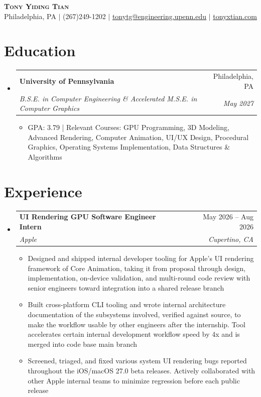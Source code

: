 \documentclass[letterpaper,11pt]{article}
\makeatletter
\newcommand{\resumeItem}[1]{
  \item\small{
    {#1 \vspace{-3pt}}
  }
}
\newcommand{\resumeSubheading}[4]{
  \vspace{-2pt}\item
    \begin{tabular*}{0.97\textwidth}[t]{l@{\extracolsep{\fill}}r}
      \textbf{#1} & #2 \\
      \textit{\small#3} & \textit{\small #4} \\
    \end{tabular*}\vspace{-7pt}
}
\newcommand{\resumeSubHeadingListStart}{\begin{itemize}[leftmargin=0.15in, label={}]}
\newcommand{\resumeSubHeadingListEnd}{\end{itemize}}
\newcommand{\resumeItemListStart}{\begin{itemize}}
\newcommand{\resumeItemListEnd}{\end{itemize}\vspace{-5pt}}
\makeatother
\begin{document}
\begin{center}
    \textbf{\Huge \scshape Tony Yiding Tian} \\ \vspace{1pt}
    \small Philadelphia, PA $|$ (267)249-1202 $|$ \href{mailto:tonytg@engineering.upenn.edu}{\underline{tonytg@engineering.upenn.edu}} $|$
    \href{https://tonyxtian.com}{\underline{tonyxtian.com}}
\end{center}

\section{Education}
  \resumeSubHeadingListStart
    \resumeSubheading
      {University of Pennsylvania}{Philadelphia, PA}
      {B.S.E. in Computer Engineering \& Accelerated M.S.E. in Computer Graphics}{May 2027}
      \resumeItemListStart
        \resumeItem{GPA: 3.79 | Relevant Courses: GPU Programming, 3D Modeling, Advanced Rendering, Computer Animation, UI/UX Design, Procedural Graphics, Operating Systems Implementation, Data Structures \& Algorithms}
      \resumeItemListEnd
  \resumeSubHeadingListEnd

  \section{Experience}
  \resumeSubHeadingListStart
    \resumeSubheading
      {UI Rendering GPU Software Engineer Intern}{May 2026 -- Aug 2026}
      {Apple}{Cupertino, CA}
      \resumeItemListStart
        \resumeItem{Designed and shipped internal developer tooling for Apple's UI rendering framework of Core Animation, taking it from proposal through design, implementation, on-device validation, and multi-round code review with senior engineers toward integration into a shared release branch}
        \resumeItem{Built cross-platform CLI tooling and wrote internal architecture documentation of the subsystems involved, verified against source, to make the workflow usable by other engineers after the internship. Tool accelerates certain internal development workflow speed by 4x and is merged into code base main branch}
        \resumeItem{Screened, triaged, and fixed various system UI rendering bugs reported throughout the iOS/macOS 27.0 beta releases. Actively collaborated with other Apple internal teams to minimize regression before each public release}
    \resumeItemListEnd
  \resumeSubHeadingListEnd

\end{document}
